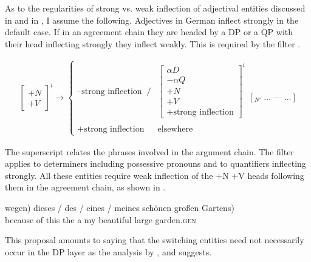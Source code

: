 \documentclass[output=paper,colorlinks,citecolor=brown]{langscibook}
\begin{document}
\noindent As to the regularities of strong vs. weak inflection of adjectival entities discussed in \citet{Olsen88Agreement-und-Flexion, Olsen89AGReement-in} and in \citet{Delsing88The-Scandinavian, Delsing90A-DP-analysis}, I assume the following. Adjectives in German inflect strongly in the default case. If in an agreement chain they are headed by a DP or a QP with their head inflecting strongly they inflect weakly. This is required by the filter .

\ea \label{ex:zi91:56} 
\begin{align*} 
\left[ \begin{array}{c}
     +N \\
     +V
\end{array} \right]^{i} 
\rightarrow 
\left\{ \begin{array}{ll}
    \mbox{--strong inflection} \;\; / & 
        \left[ \begin{array}{l}
            \alpha D \\
            -\alpha Q \\
            +N \\
            +V \\
            \mbox{+strong inflection}
        \end{array} \right]^{i} \\
    & \\
    \mbox{+strong inflection} & \mbox{elsewhere}
\end{array} 
[_{N'} \; ... \; \mbox{---} \; ...] \right. 
\end{align*}
\z

\noindent The superscript relates the phrases involved in the argument chain. The filter applies to determiners including possessive pronouns and to quantifiers inflecting strongly. All these entities require weak inflection of the $+$N $+$V heads following them in the agreement chain, as shown in .

\ea \label{ex:zi91:57} 
    \gll \minsp{(} wegen) dieses / des / eines / meines schönen großen \minsp{(} Gartens)\\
    {} {because of} this {} the {} a {} my beautiful large {} garden.\textsc{gen}\\ 
\z

\noindent This proposal amounts to saying that the switching entities need not necessarily occur in the DP layer as the analysis by \citet{Olsen88Agreement-und-Flexion, Olsen89AGReement-in}, \citet{Bhatt90Die-syntaktische} and \citet{Delsing88The-Scandinavian, Delsing90A-DP-analysis} suggests.
\end{document}
